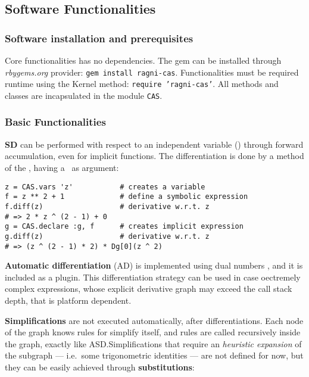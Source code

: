 \subsection{Software Functionalities}
\label{sec:functionalities}

\subsubsection{Software installation and prerequisites}

Core functionalities has no dependencies. The gem can be installed through \emph{rbygems.org} provider: \texttt{gem install ragni-cas}. Functionalities must be required runtime using the Kernel method: \texttt{require 'ragni-cas'}. All methods and classes are incapsulated in the module \texttt{CAS}.

\subsubsection{Basic Functionalities}
\textbf{SD} can be performed with respect to an independent variable (\CASVariable) through forward accumulation, even for implicit functions. The differentiation is done by a method of the \CASOp, having a \CASVariable~as argument:

\noindent%
\begin{lstlisting}[caption={Differentiation example},label={code:example-diff}]
z = CAS.vars 'z'           # creates a variable
f = z ** 2 + 1             # define a symbolic expression
f.diff(z)                  # derivative w.r.t. z
# => 2 * z ^ (2 - 1) + 0
g = CAS.declare :g, f      # creates implicit expression
g.diff(z)                  # derivative w.r.t. z
# => (z ^ (2 - 1) * 2) * Dg[0](z ^ 2)
\end{lstlisting}

\textbf{Automatic differentiation} (AD) is implemented using dual numbers \cite{bartholomew2000automatic}, and it is included as a plugin. This differentiation strategy can be used in case oectremely complex expressions, whose explicit derivative graph may exceed the call stack depth, that is platform dependent.

\textbf{Simplifications} are not executed automatically, after differentiations. Each node of the graph knows rules for simplify itself, and rules are called recursively inside the graph, exactly like ASD.\@ Simplifications that require an \emph{heuristic expansion} of the subgraph --- i.e.\ some trigonometric identities --- are not defined for now, but they can be easily achieved through \textbf{substitutions}:

